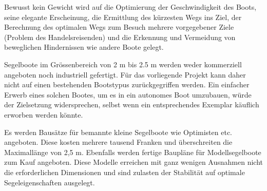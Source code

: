 Bewusst kein Gewicht wird auf die Optimierung der Geschwindigkeit des Boots, seine elegante Erscheinung, die Ermittlung des kürzesten Wegs ins Ziel, der Berechnung des optimalen Wegs zum Besuch mehrere vorgegebener Ziele (Problem des Handelsreisenden) und die Erkennung und Vermeidung von beweglichen Hindernissen wie andere Boote gelegt. 

Segelboote im Grössenbereich von 2 m bis 2.5 m werden weder kommerziell angeboten noch industriell gefertigt. Für das vorliegende Projekt kann daher nicht auf einen bestehenden Bootstypus zurückgegriffen werden. Ein einfacher Erwerb eines solchen Bootes, um es in ein autonomes Boot umzubauen, würde der Zielsetzung widersprechen, selbst wenn ein entsprechendes Exemplar käuflich erworben werden könnte.

Es werden Bausätze für bemannte kleine Segelboote wie Optimisten etc. angeboten. Diese kosten mehrere tausend Franken und überschreiten die Maximallänge von 2,5 m. Ebenfalls werden fertige Baupläne für Modellsegelboote zum Kauf angeboten. Diese Modelle erreichen mit ganz wenigen Ausnahmen nicht die erforderlichen Dimensionen und sind zulasten der Stabilität auf optimale Segeleigenschaften ausgelegt.

